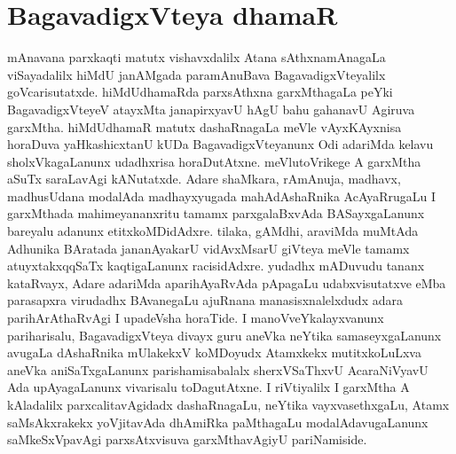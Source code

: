 \makeatletter
\def\@makechapterhead#1{%
  \vspace*{10\p@}%
{\fontsize{13pt}{13pt}\selectfont\raggedright{\bf sAvxmi tapasAyxnaMda}\par}
\vspace*{25\p@}%
  {\parindent \z@ \centering \normalfont
    \ifnum \c@secnumdepth >\m@ne
      \if@mainmatter
        {\LARGE\bfseries  #1}\par\nobreak
	\vskip 4pt
      \fi
    \fi
\smallskip 


 \vskip 10\p@  
{\fontsize{12pt}{12pt}\selectfont\raggedleft{anu: \bf pu.ti.na.}\par}
  }
\vskip 40\p@}
\makeatother

\chapter{BagavadigxVteya dhamaR}

\setcounter{endnote}{0}

mAnavana parxkaqti matutx vishavxdalilx Atana sAthxnamAnagaLa viSayadalilx  hiMdU janAMgada paramAnuBava BagavadigxVteyalilx goVcarisutatxde. hiMdUdhamaRda parxsAthxna garxMthagaLa peYki BagavadigxVteyeV atayxMta janapirxyavU hAgU bahu gahanavU Agiruva garxMtha. hiMdUdhamaR matutx dashaRnagaLa meVle vAyxKAyxnisa horaDuva yaHkashicxtanU kUDa BagavadigxVteyanunx Odi adariMda kelavu sholxVkagaLanunx udadhxrisa horaDutAtxne. meVlutoVrikege A garxMtha aSuTx saraLavAgi kANutatxde. Adare shaMkara, rAmAnuja, madhavx, madhusUdana modalAda madhayxyugada mahAdAshaRnika AcAyaRrugaLu I garxMthada mahimeyananxritu tamamx parxgalaBxvAda BASayxgaLanunx bareyalu adanunx etitxkoMDidAdxre. tilaka, gAMdhi, araviMda muMtAda Adhunika BAratada jananAyakarU vidAvxMsarU giVteya meVle tamamx atuyxtakxqqSaTx kaqtigaLanunx racisidAdxre. yudadhx mADuvudu tananx kataRvayx, Adare adariMda aparihAyaRvAda pApagaLu udabxvisutatxve eMba parasapxra virudadhx BAvanegaLu ajuRnana manasisxnalelxdudx adara parihArAthaRvAgi I upadeVsha horaTide. I manoVveYkalayxvanunx pariharisalu, BagavadigxVteya divayx guru aneVka neYtika samaseyxgaLanunx avugaLa dAshaRnika mUlakekxV koMDoyudx Atamxkekx mutitxkoLuLxva aneVka aniSaTxgaLanunx parishamisabalalx sherxVSaThxvU AcaraNiVyavU Ada upAyagaLanunx vivarisalu toDagutAtxne. I riVtiyalilx I garxMtha A kAladalilx parxcalitavAgidadx dashaRnagaLu, neYtika vayxvasethxgaLu, Atamx saMsAkxrakekx yoVjitavAda dhAmiRka paMthagaLu modalAdavugaLanunx saMkeSxVpavAgi parxsAtxvisuva garxMthavAgiyU pariNamiside.

